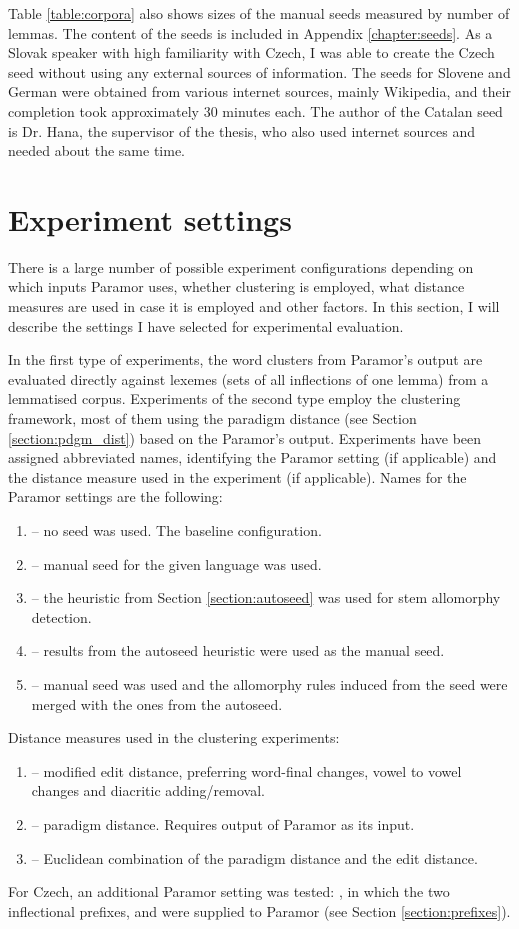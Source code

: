 Table \ref{table:corpora} also shows sizes of the manual seeds measured by number of lemmas. The content of the seeds is included in Appendix \ref{chapter:seeds}. As a Slovak speaker with high familiarity with Czech, I was able to create the Czech seed without using any external sources of information. The seeds for Slovene and German were obtained from various internet sources, mainly Wikipedia, and their completion took approximately 30 minutes each. The author of the Catalan seed is Dr. Hana, the supervisor of the thesis, who also used internet sources and needed about the same time.

\section{Experiment settings}
There is a large number of possible experiment configurations depending on which inputs Paramor uses, whether clustering is employed, what distance measures are used in case it is employed and other factors. In this section, I will describe the settings I have selected for experimental evaluation. 

In the first type of experiments, the word clusters from Paramor's output are evaluated directly against lexemes (sets of all inflections of one lemma) from a lemmatised corpus. Experiments of the second type employ the clustering framework, most of them using the paradigm distance (see Section \ref{section:pdgm_dist}) based on the Paramor's output. Experiments have been assigned abbreviated names, identifying the Paramor setting (if applicable) and the distance measure used in the experiment (if applicable). Names for the Paramor settings are the following: 
\begin{enumerate}
\item {} -- no seed was used. The baseline configuration.
\item {} -- manual seed for the given language was used.
\item {} -- the heuristic from Section \ref{section:autoseed} was used for stem allomorphy detection.
\item {} -- results from the autoseed heuristic were used as the manual seed.
\item {} -- manual seed was used and the allomorphy rules induced from the seed were merged with the ones from the autoseed. 
\end{enumerate}
Distance measures used in the clustering experiments: 
\begin{enumerate}
\item {} -- modified edit distance, preferring word-final changes, vowel to vowel changes and diacritic adding/removal.
\item {} -- paradigm distance. Requires output of Paramor as its input.
\item {} -- Euclidean combination of the paradigm distance and the edit distance.
\end{enumerate}
For Czech, an additional Paramor setting was tested: , in which the two inflectional prefixes,  and  were supplied to Paramor (see Section \ref{section:prefixes}).


